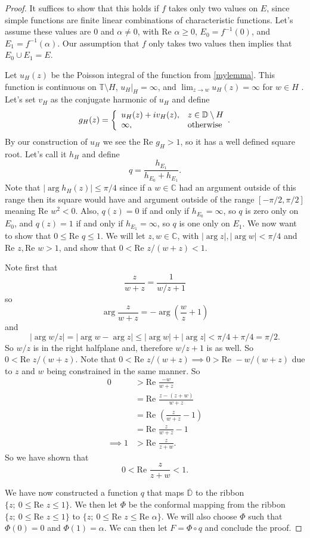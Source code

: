 \documentclass[a4paper,12pt,twoside,BCOR=10mm]{scrbook}
\theoremstyle{definition}
\theoremstyle{definition}
\theoremstyle{definition}
\renewcommand{\Re}{\text{Re }}
\begin{document}
\begin{proof}
It suffices to show that this holds if $f$ takes only two values on $E$, since simple functions are finite linear combinations of characteristic functions.
Let's assume these values are $0$ and $\alpha \neq 0$, with $\Re \alpha \geq 0$, $E_0 = f^{-1}(0)$, and $E_1 = f^{-1}(\alpha)$.
Our assumption that $f$ only takes two values then implies that $E_0 \cup E_1 = E$.

Let $u_H(z)$ be the Poisson integral of the function from \ref{mylemma}.
This function is continuous on $\mathbb{T} \setminus H$, $u_H|_H = \infty$, and $\lim_{z \rightarrow w} u_H(z) = \infty$ for $w \in H$ \citep[page $234$]{rudin2}.
Let's set $v_H$ as the conjugate harmonic of $u_H$ and define
\[
	g_H(z) =
	\left \{
		\begin{array}{l l}
		u_H(z) + iv_H(z), & z \in \mathbb{D} \setminus H\\
		\infty, & \text{otherwise}
		\end{array}.
	\right .
\]
By our construction of $u_H$ we see the $\Re g_H > 1$, so it has a well defined square root.
Let's call it $h_H$ and define
\[
	q = \frac{h_{E_1}}{h_{E_0} + h_{E_1}}.
\]
Note that $|\arg h_H(z)| \leq \pi/4$ since if a $w \in \mathbb{C}$ had an argument outside of this range then its square would have and argument outside of the range $[-\pi/2, \pi/2]$ meaning $\Re w^2 < 0$.
Also, $q(z) = 0$ if and only if $h_{E_0} = \infty$, so $q$ is zero only on $E_0$, and $q(z) = 1$ if and only if $h_{E_1} = \infty$, so $q$ is one only on $E_1$.
We now want to show that $0 \leq \Re q \leq 1$.
We will let $z, w \in \mathbb{C}$, with $|\arg z|, |\arg w| < \pi/4$ and $\Re z, \Re w > 1$, and show that $0 < \Re z/(w + z) < 1$.

Note first that
\[
	\frac{z}{w + z}
	=
	\frac{1}{w/z + 1}
\]
so 
\[
	\arg \frac{z}{w + z} = -\arg \left ( \frac{w}{z} + 1 \right )
\]
and
\[
	|\arg w/z| = |\arg w - \arg z| \leq |\arg w| + |\arg z| < \pi/4 + \pi/4 = \pi/2.
\]
So $w/z$ is in the right halfplane and, therefore $w/z + 1$ is as well.
So $0 < \Re z/(w + z)$.
Note that $0 < \Re z/(w + z) \implies 0 > \Re -w/(w + z)$ due to $z$ and $w$ being constrained in the same manner.
So
\begin{align*}
	0
	&> \Re \frac{-w}{w + z}\\
	&= \Re \frac{z - (z + w)}{w + z}\\
	&= \Re \left ( \frac{z}{w + z} - 1 \right )\\
	&= \Re \frac{z}{w + z} - 1\\
	\implies 1 &> \Re \frac{z}{z + w}.
\end{align*}
So we have shown that
\[
	0 < \Re \frac{z}{z + w} < 1.
\]

We have now constructed a function $q$ that maps $\overline{\mathbb{D}}$ to the ribbon $\{z;\ 0 \leq \Re z \leq 1\}$.
We then let $\Phi$ be the conformal mapping from the ribbon $\{z;\ 0 \leq \Re z \leq 1\}$ to $\{z;\ 0 \leq \Re z \leq \Re \alpha\}$.
We will also choose $\Phi$ such that $\Phi(0) = 0$ and $\Phi(1) = \alpha$.
We can then let $F = \Phi \circ q$ and conclude the proof.

\end{proof}
\end{document}

